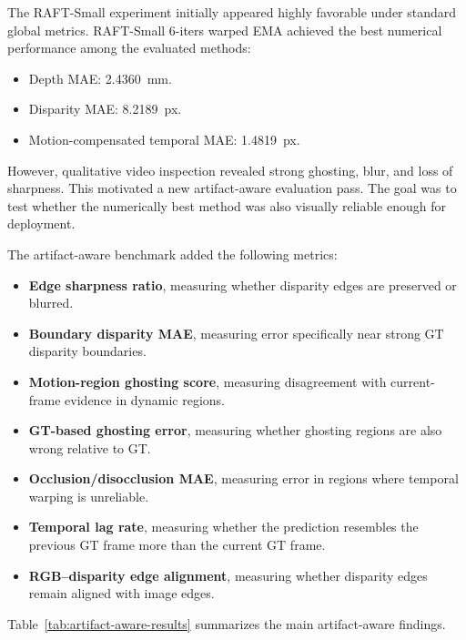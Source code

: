 \documentclass[11pt,a4paper]{article}
\begin{document}
The RAFT-Small experiment initially appeared highly favorable under standard global metrics. RAFT-Small 6-iters warped EMA achieved the best numerical performance among the evaluated methods:

\begin{itemize}[leftmargin=*]
\item Depth MAE: \SI{2.4360}{mm}.
\item Disparity MAE: \SI{8.2189}{px}.
\item Motion-compensated temporal MAE: \SI{1.4819}{px}.
\end{itemize}

However, qualitative video inspection revealed strong ghosting, blur, and loss of sharpness. This motivated a new artifact-aware evaluation pass. The goal was to test whether the numerically best method was also visually reliable enough for deployment.

The artifact-aware benchmark added the following metrics:

\begin{itemize}[leftmargin=*]
\item \textbf{Edge sharpness ratio}, measuring whether disparity edges are preserved or blurred.
\item \textbf{Boundary disparity MAE}, measuring error specifically near strong GT disparity boundaries.
\item \textbf{Motion-region ghosting score}, measuring disagreement with current-frame evidence in dynamic regions.
\item \textbf{GT-based ghosting error}, measuring whether ghosting regions are also wrong relative to GT.
\item \textbf{Occlusion/disocclusion MAE}, measuring error in regions where temporal warping is unreliable.
\item \textbf{Temporal lag rate}, measuring whether the prediction resembles the previous GT frame more than the current GT frame.
\item \textbf{RGB–disparity edge alignment}, measuring whether disparity edges remain aligned with image edges.
\end{itemize}

Table~\ref{tab:artifact-aware-results} summarizes the main artifact-aware findings.
\end{document}
